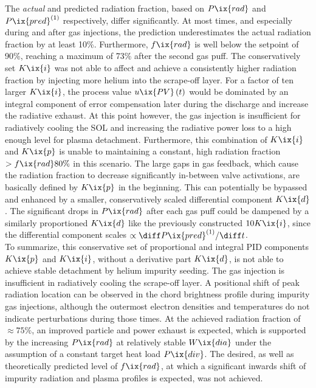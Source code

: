             The \textit{actual} and predicted radiation fraction, based on $P\ix{rad}$ and $P\ix{pred}^{\left(1\right)}$ respectively, differ significantly. At most times, and especially during and after gas injections, the prediction underestimates the actual radiation fraction by at least 10\%. Furthermore, $f\ix{rad}$ is well below the setpoint of 90\%, reaching a maximum of 73\% after the second gas puff. The conservatively set $K\ix{i}$ was not able to affect and achieve a consistently higher radiation fraction by injecting more helium into the scrape-off layer. For a factor of ten larger $K\ix{i}$, the process value $u\ix{PV}\left(t\right)$ would be dominated by an integral component of error compensation later during the discharge and increase the radiative exhaust. At this point however, the gas injection is insufficient for radiatively cooling the SOL and increasing the radiative power loss to a high enough level for plasma detachment. Furthermore, this combination of $K\ix{i}$ and $K\ix{p}$ is unable to maintaining a constant, high radiation fraction $>f\ix{rad}80\%$ in this scenario. The large gaps in gas feedback, which cause the radiation fraction to decrease significantly in-between valve activations, are basically defined by $K\ix{p}$ in the beginning. This can potentially be bypassed and enhanced by a smaller, conservatively scaled differential component $K\ix{d}$. The significant drops in $P\ix{rad}$ after each gas puff could be dampened by a similarly proportioned $K\ix{d}$ like the previously constructed $10K\ix{i}$, since the differential component scales $\propto\diff P\ix{pred}^{\left(1\right)}/\diff t$.\\%
            To summarize, this conservative set of proportional and integral PID components $K\ix{p}$ and $K\ix{i}$, without a derivative part $K\ix{d}$, is not able to achieve stable detachment by helium impurity seeding. The gas injection is insufficient in radiatively cooling the scrape-off layer. A positional shift of peak radiation location can be observed in the chord brightness profile during impurity gas injections, although the outermost electron densities and temperatures do not indicate perturbations during those times. At the achieved radiation fraction of $\approx75\%$, an improved particle and power exhaust is expected, which is supported by the increasing $P\ix{rad}$ at relatively stable $W\ix{dia}$ under the assumption of a constant target heat load $P\ix{div}$. The desired, as well as theoretically predicted level of $f\ix{rad}$\cite{Feng2016}, at which a significant inwards shift of impurity radiation and plasma profiles is expected, was not achieved.\\%
